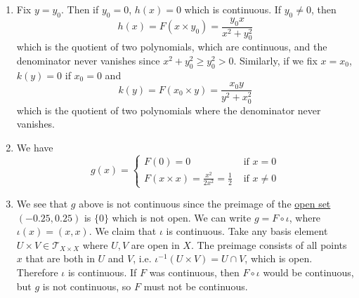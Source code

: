   \begin{solution}
    \begin{enumerate}
      \item Fix $y = y_0$. Then if $y_0 = 0$, $h(x) = 0$ which is continuous. If $y_0 \neq 0$, then 
      \begin{equation}
        h(x) = F(x \times y_0) = \frac{y_0 x}{x^2 + y_0^2}
      \end{equation}
      which is the quotient of two polynomials, which are continuous, and the denominator never vanishes since $x^2 + y_0^2 \geq y_0^2 > 0$. Similarly, if we fix $x = x_0$, $k(y) = 0$ if $x_0 = 0$ and 
      \begin{equation}
        k(y) = F(x_0 \times y) = \frac{x_0 y}{y^2 + x_0^2}
      \end{equation}
      which is the quotient of two polynomials where the denominator never vanishes. 

      \item We have 
      \begin{equation}
        g(x) = \begin{cases} 
          F(0) = 0 & \text{ if } x = 0 \\
          F(x \times x) = \frac{x^2}{2 x^2} = \frac{1}{2} & \text{ if } x \neq 0
        \end{cases}
      \end{equation}

      \item We see that $g$ above is not continuous since the preimage of the \hyperref[def:open-set]{open set} $(-0.25, 0.25)$ is $\{0\}$ which is not open. We can write $g = F \circ \iota$, where $\iota(x) = (x, x)$. We claim that $\iota$ is continuous. Take any basis element $U \times V \in \mathscr{T}_{X \times X}$ where $U, V$ are open in $X$. The preimage consists of all points $x$ that are both in $U$ and $V$, i.e. $\iota^{-1} (U \times V) = U \cap V$, which is open.  Therefore $\iota$ is continuous. If $F$ was continuous, then $F \circ \iota$ would be continuous, but $g$ is not continuous, so $F$ must not be continuous. 
    \end{enumerate}
  \end{solution}

